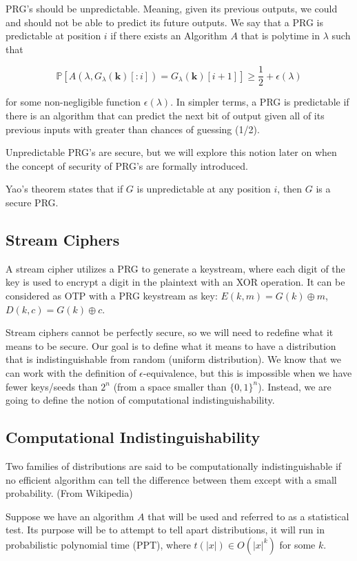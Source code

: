 \documentclass{article}
\begin{document}
\begin{multicols}{2}
PRG's should be unpredictable. Meaning, given its previous outputs, we could and should not be able to predict its future outputs. We say that a PRG is predictable at position $i$ if there exists an Algorithm $A$ that is polytime in $\lambda$ such that

$$
\mathbb{P}[A(\lambda, G_\lambda(\mathbf{k})[:i]) = G_\lambda(\mathbf{k})[i+1]] \geq \frac{1}{2} + \epsilon(\lambda)
$$

for some non-negligible function $\epsilon(\lambda)$. In simpler terms, a PRG is predictable if there is an algorithm that can predict the next bit of output given all of its previous inputs with greater than chances of guessing (1/2).

Unpredictable PRG's are secure, but we will explore this notion later on when the concept of security of PRG's are formally introduced.

Yao's theorem states that if $G$ is unpredictable at any position $i$, then $G$ is a secure PRG.

\subsection {Stream Ciphers}

A stream cipher utilizes a PRG to generate a keystream, where each digit of the key is used to encrypt a digit in the plaintext with an XOR operation. It can be considered as OTP with a PRG keystream as key: $E(k,m) = G(k) \oplus m$, $D(k,c) = G(k) \oplus c$. 

Stream ciphers cannot be perfectly secure, so we will need to redefine what it means to be secure. Our goal is to define what it means to have a distribution that is indistinguishable from random (uniform distribution). We know that we can work with the definition of $\epsilon$-equivalence, but this is impossible when we have fewer keys/seeds than $2^n$ (from a space smaller than $\{0,1\}^n$). Instead, we are going to define the notion of computational indistinguishability.

\subsection {Computational Indistinguishability}

Two families of distributions are said to be computationally indistinguishable if no efficient algorithm can tell the difference between them except with a small probability. (From Wikipedia)

Suppose we have an algorithm $A$ that will be used and referred to as a statistical test. Its purpose will be to attempt to tell apart distributions, it will run in probabilistic polynomial time (PPT), where $t(|x|) \in O(|x|^k)$ for some $k$.


\end{multicols}
\end{document}
